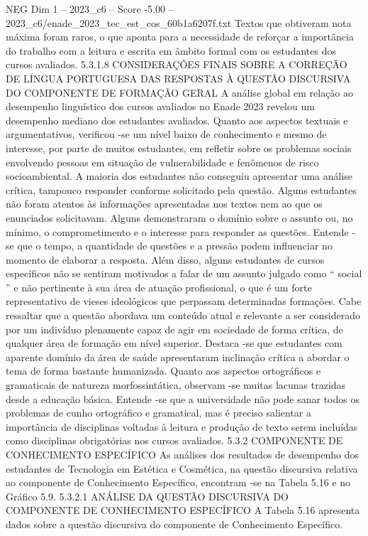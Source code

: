 \begin{textsample}{NEG Dim 1 – 2023\_c6 – Score -5.00 – 2023\_c6/enade\_2023\_tec\_est\_cos\_60b1a6207f.txt}
Textos que obtiveram nota máxima foram raros, o que aponta para a necessidade de reforçar a importância do trabalho com a leitura e escrita em âmbito formal com os estudantes dos cursos avaliados. 5.3.1.8 CONSIDERAÇÕES FINAIS SOBRE A CORREÇÃO DE LÍNGUA PORTUGUESA DAS RESPOSTAS À QUESTÃO DISCURSIVA DO COMPONENTE DE FORMAÇÃO GERAL A análise global em relação ao desempenho linguístico dos cursos avaliados no Enade 2023 revelou um desempenho mediano dos estudantes avaliados.
Quanto aos aspectos textuais e argumentativos, verificou -se um nível baixo de conhecimento e mesmo de interesse, por parte de muitos estudantes, em refletir sobre os problemas sociais envolvendo pessoas em situação de vulnerabilidade e fenômenos de risco socioambiental.
A maioria dos estudantes não conseguiu apresentar uma análise crítica, tampouco responder conforme solicitado pela questão.
Alguns estudantes não foram atentos às informações apresentadas nos textos nem ao que os enunciados solicitavam.
Alguns demonstraram o domínio sobre o assunto ou, no mínimo, o comprometimento e o interesse para responder as questões.
Entende -se que o tempo, a quantidade de questões e a pressão podem influenciar no momento de elaborar a resposta.
Além disso, alguns estudantes de cursos específicos não se sentiram motivados a falar de um assunto julgado como “ social ” e não pertinente à sua área de atuação profissional, o que é um forte representativo de vieses ideológicos que perpassam determinadas formações.
Cabe ressaltar que a questão abordava um conteúdo atual e relevante a ser considerado por um indivíduo plenamente capaz de agir em sociedade de forma crítica, de qualquer área de formação em nível superior.
Destaca -se que estudantes com aparente domínio da área de saúde apresentaram inclinação crítica a abordar o tema de forma bastante humanizada.
Quanto aos aspectos ortográficos e gramaticais de natureza morfossintática, observam -se muitas lacunas trazidas desde a educação básica.
Entende -se que a universidade não pode sanar todos os problemas de cunho ortográfico e gramatical, mas é preciso salientar a importância de disciplinas voltadas à leitura e produção de texto serem incluídas como disciplinas obrigatórias nos cursos avaliados. 5.3.2 COMPONENTE DE CONHECIMENTO ESPECÍFICO As análises dos resultados de desempenho dos estudantes de Tecnologia em Estética e Cosmética, na questão discursiva relativa ao componente de Conhecimento Específico, encontram -se na Tabela 5.16 e no Gráfico 5.9. 5.3.2.1 ANÁLISE DA QUESTÃO DISCURSIVA DO COMPONENTE DE CONHECIMENTO ESPECÍFICO A Tabela 5.16 apresenta dados sobre a questão discursiva do componente de Conhecimento Específico.

\end{textsample}
